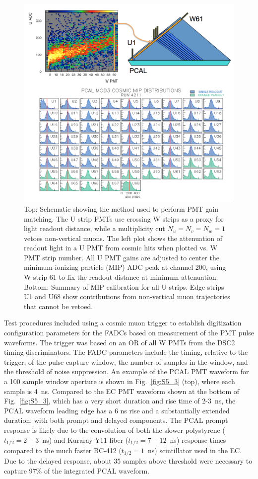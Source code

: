 \begin{figure}[hbt]
\centering
\includegraphics[width=0.95\columnwidth,keepaspectratio]{img/S5_4.png}
\caption{Top: Schematic showing the method used to perform PMT gain matching. The U strip PMTs use crossing W
  strips as a proxy for light readout distance, while a multiplicity cut $N_u=N_v=N_w=1$ vetoes non-vertical muons.
  The left plot shows the attenuation of readout light in a U PMT from cosmic hits when plotted vs. W PMT strip
  number. All U PMT gains are adjusted to center the minimum-ionizing particle (MIP) ADC peak at channel 200,
  using W strip 61 to fix the readout distance at minimum attenuation. Bottom: Summary of MIP calibration for all
  U strips. Edge strips U1 and U68 show contributions from non-vertical muon trajectories that cannot be vetoed.}
\label{fig:S5_4}
\end{figure}

Test procedures included using a cosmic muon trigger to establish digitization configuration parameters for the
FADCs based on measurement of the PMT pulse waveforms.  The trigger was based on an OR of all W PMTs from
the DSC2 timing discriminators. The FADC parameters include the timing, relative to the trigger, of the pulse
capture window, the number of samples in the window, and the threshold of noise suppression. An example of the
PCAL PMT waveform for a 100 sample window aperture is shown in Fig.~\ref{fig:S5_3} (top), where each sample
is 4~ns. Compared to the EC PMT waveform shown at the bottom of Fig.~\ref{fig:S5_3}, which has a very short
duration and rise time of 2-3~ns, the PCAL waveform leading edge has a 6 ns rise and a substantially extended
duration, with both prompt and delayed components. The PCAL prompt response is likely due to the convolution of
both the slower polystyrene ($t_{1/2}=2-3$~ns) and Kuraray Y11 fiber ($t_{1/2}=7-12$~ns) response times compared
to the much faster BC-412 ($t_{1/2}=1$~ns) scintillator used in the EC. Due to the delayed response, about 35
samples above threshold were necessary to capture 97\% of the integrated PCAL waveform.  

